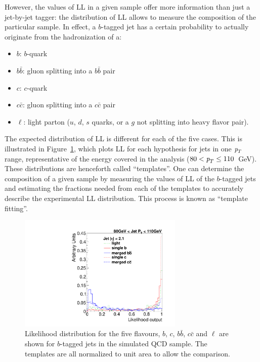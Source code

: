 However, the values of LL in a given sample offer more information than just a jet-by-jet tagger: the distribution of LL allows to measure the composition of the particular sample. In effect, a $b$-tagged jet has a certain probability to actually originate from the hadronization of a:

\begin{itemize}
\item
$b$: $b$-quark
\item
$b\bar{b}$: gluon splitting into a $b\bar{b}$ pair
\item
$c$: $c$-quark
\item
$c\bar{c}$: gluon splitting into a $c\bar{c}$ pair
\item
$\ell$: light parton ($u$, $d$, $s$ quarks, or a $g$ not splitting into heavy flavor pair).
\end{itemize}

The expected distribution of LL is different for each of the five cases. This is illustrated in Figure~\ref{fig:templates}, which plots LL for each hypothesis for jets in one ${\emph{p}_{T}}$ range, representative of the energy covered in the analysis ($80<{\emph{p}_{T}}\leq110$~GeV). These distributions are henceforth called ``templates''. One can determine the composition of a given sample by measuring the values of LL of the $b$-tagged jets and estimating the fractions needed from each of the templates to accurately describe the experimental LL distribution. This process is known as ``template fitting''.

\begin{figure}[tp]
\centering
\includegraphics[width=0.70\textwidth]{FIGS/Fits/AllTemplates080.pdf}
\caption{Likelihood distribution for the five flavours, $b$, $c$, $b\bar{b}$, $c\bar{c}$ and $\ell$ are shown for $b$-tagged jets in the simulated QCD sample. The templates are all normalized to unit area to allow the comparison.}
\label{fig:templates}
\end{figure}




